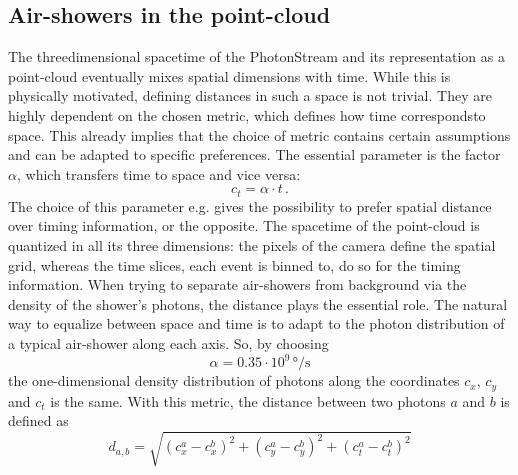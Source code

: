 \subsection{Air-showers in the point-cloud}
%
The threedimensional spacetime of the PhotonStream and its representation as a
point-cloud eventually mixes spatial dimensions with time. While this is
physically motivated, defining distances in such a space is not trivial. They
are highly dependent on the chosen metric, which defines how time correspondsto
space. This already implies that the choice of metric contains certain
assumptions and can be adapted to specific preferences. The essential parameter
is the factor $\alpha$, which transfers time to space and vice versa:
%
\begin{equation}
  c_{t} = \alpha \cdot t \, .
  \label{eq:metric}
\end{equation}
%
The choice of this parameter e.g. gives the possibility to prefer spatial
distance over timing information, or the opposite. The spacetime of the
point-cloud is quantized in all its three dimensions: the pixels of the camera
define the spatial grid, whereas the time slices, each event is binned to, do so
for the timing information. When trying to separate air-showers from
background via the density of the shower's photons, the distance plays the
essential role. The natural way to equalize between space and time is to adapt
to the photon distribution of a typical air-shower along each axis. So, by
choosing
%
\begin{equation}
  \alpha = 0.35\cdot10^9\,\si{\degree\per\second}
\end{equation}
%
the one-dimensional density distribution of photons along the coordinates
$c_x$, $c_y$ and $c_t$ is the same. With this metric, the distance between two
photons $a$ and $b$ is defined as
%
\begin{equation}
  d_{a,b} = \sqrt{(c_x^a - c_x^b)^2 + (c_y^a - c_y^b)^2 + (c_t^a - c_t^b)^2}
\end{equation}

